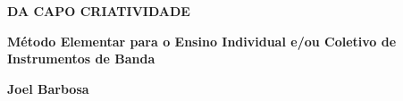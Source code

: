 \thispagestyle{empty}

\begin{center}

\textbf{\huge{DA CAPO CRIATIVIDADE}}
  \vspace*{38ex}

\textbf{\Large{Método Elementar para o Ensino Individual e/ou Coletivo
    de Instrumentos de Banda
  }}
  \vspace*{38ex}

\textbf{\huge{Joel Barbosa}}
  \vspace*{38ex}

\end{center}